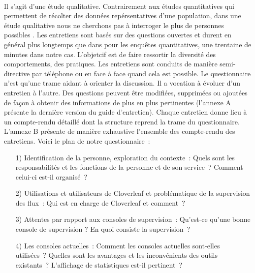 			\paragraph{}%
			Il s'agit d'une étude qualitative. Contrairement aux études quantitatives qui
			permettent de récolter des données repérsentatives d'une population, dans une
			étude qualitative nous ne cherchons pas à interroger le plus de personnes
			possibles \citep{alami_les_2009}. Les entretiens sont basés sur des questions
			ouvertes et durent en général plus longtemps que dans pour les enquêtes
			quantitatives, une trentaine de minutes dans notre cas.
			L'objetcif est de faire ressortir la diversité des comportements, des
			pratiques.\newline
			Les entretiens sont conduits de manière semi-directive par téléphone ou en
			face à face quand cela est possible.
			Le questionnaire n'est qu'une trame aidant à orienter la discussion. Il a
			vocation à évoluer d’un entretien à l'autre. Des questions peuvent être
			modifiées, supprimées ou ajoutées de façon à obtenir des informations de plus en
			plus pertinentes (l'annexe A présente la dernière version du guide
			d'entretien).
			Chaque entretien donne lieu à un compte-rendu détaillé dont la structure reprend
			la trame du
			questionnaire. L'annexe B présente de manière exhaustive l'ensemble
			des compte-rendu des entretiens.\newline
			Voici le plan de notre
			questionnaire~:
			\begin{itemize}
			  \item[1) Identification de la personne, exploration du contexte~:] Quels
			  sont les responsabilités et les fonctions de la personne et de son
			  service~? Comment celui-ci est-il organisé~?
			  \item[2) Utilisations et utilisateurs de Cloverleaf et problématique de la
			  supervision des flux~:] Qui est en charge de Cloverleaf et comment~?
			  \item[3) Attentes par rapport aux consoles de supervision~:] Qu'est-ce
			  qu'une bonne console de supervision ? En quoi consiste la supervision~?
			  \item[4) Les consoles actuelles~:] Comment les consoles actuelles
			  sont-elles utilisées~? Quelles sont les avantages et les inconvénients des
			  outils existants~? L'affichage de statistiques est-il pertinent~?
			\end{itemize}
			
